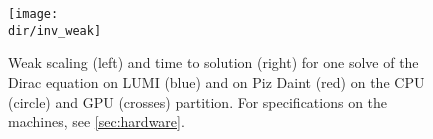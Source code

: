 \begin{figure}
    \centering
    \texttt{[image: \\dir/inv\_weak]}
    \caption{Weak scaling (left) and time to solution (right) for one solve of the Dirac equation on LUMI (blue) and on Piz Daint (red) on the CPU (circle) and GPU (crosses) partition. For specifications on the machines, see \cref{sec:hardware}.}
    \label{fig:inv_weak}
\end{figure}
